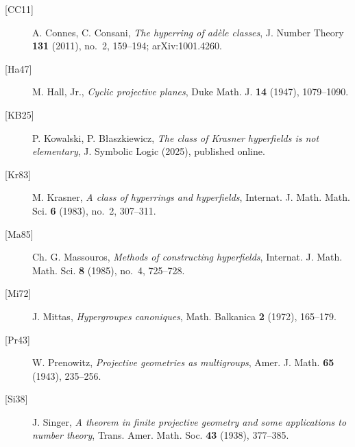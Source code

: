 \documentclass[12pt]{article}
\theoremstyle{plain}
\theoremstyle{definition}
\begin{document}
\begin{description}
\item[{[CC11]}] A. Connes, C. Consani,
\emph{The hyperring of ad\`ele classes},
J. Number Theory \textbf{131} (2011), no.~2, 159--194; arXiv:1001.4260.
\item[{[Ha47]}] M. Hall, Jr.,
\emph{Cyclic projective planes},
Duke Math. J. \textbf{14} (1947), 1079--1090.
\item[{[KB25]}] P. Kowalski, P. B\l{}aszkiewicz,
\emph{The class of Krasner hyperfields is not elementary},
J. Symbolic Logic (2025), published online.
\item[{[Kr83]}] M. Krasner,
\emph{A class of hyperrings and hyperfields},
Internat. J. Math. Math. Sci. \textbf{6} (1983), no.~2, 307--311.
\item[{[Ma85]}] Ch. G. Massouros,
\emph{Methods of constructing hyperfields},
Internat. J. Math. Math. Sci. \textbf{8} (1985), no.~4, 725--728.
\item[{[Mi72]}] J. Mittas,
\emph{Hypergroupes canoniques},
Math. Balkanica \textbf{2} (1972), 165--179.
\item[{[Pr43]}] W. Prenowitz,
\emph{Projective geometries as multigroups},
Amer. J. Math. \textbf{65} (1943), 235--256.
\item[{[Si38]}] J. Singer,
\emph{A theorem in finite projective geometry and some applications to
number theory},
Trans. Amer. Math. Soc. \textbf{43} (1938), 377--385.
\end{description}
\end{document}
